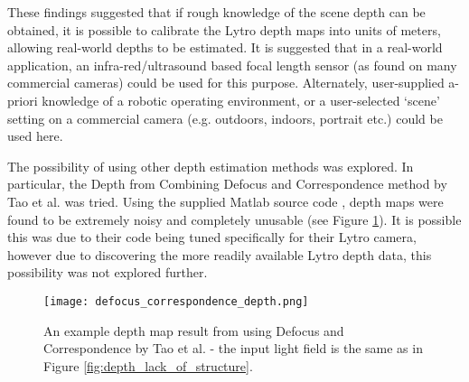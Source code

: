 These findings suggested that if rough knowledge of the scene depth can be obtained, it is possible to calibrate the Lytro depth maps into units of meters, allowing real-world depths to be estimated.
It is suggested that in a real-world application, an infra-red/ultrasound based focal length sensor (as found on many commercial cameras) could be used for this purpose.
Alternately, user-supplied a-priori knowledge of a robotic operating environment, or a user-selected \enquote*{scene} setting on a commercial camera (e.g. outdoors, indoors, portrait etc.) could be used here.

The possibility of using other depth estimation methods was explored.
In particular, the Depth from Combining Defocus and Correspondence method by Tao et al. \cite{tao2013depth} was tried.
Using the supplied Matlab source code \cite{tao2013depthwebsite}, depth maps were found to be extremely noisy and completely unusable (see Figure \ref{fig:defocus_correspondence_depth}).
It is possible this was due to their code being tuned specifically for their Lytro camera, however due to discovering the more readily available Lytro depth data, this possibility was not explored further.


\begin{figure}
\centering
\texttt{[image: defocus\_correspondence\_depth.png]}
\caption[Depth Map from combining Defocus and Correspondence]{An example depth map result from using Defocus and Correspondence by Tao et al. \cite{tao2013depthwebsite} - the input light field is the same as in Figure \ref{fig:depth_lack_of_structure}.}
\label{fig:defocus_correspondence_depth}
\end{figure}
